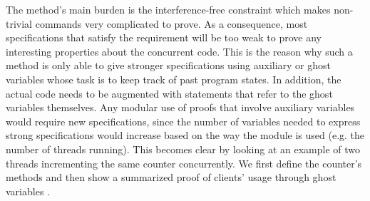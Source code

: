 The method's main burden is the \textsf{interference-free} constraint which makes non-trivial commands very complicated to prove. As a consequence, most specifications that satisfy the requirement will be too weak to prove any interesting properties about the concurrent code. This is the reason why such a method is only able to give stronger specifications using auxiliary or ghost variables whose task is to keep track of past program states. In addition, the actual code needs to be augmented with statements that refer to the ghost variables themselves. Any modular use of proofs that involve auxiliary variables would require new specifications, since the number of variables needed to express strong specifications would increase based on the way the module is used (e.g. the number of threads running). This becomes clear by looking at an example of two threads incrementing the same counter concurrently. We first define the counter's methods and then show a summarized proof of clients' usage through ghost variables \cite{modularsteps}.

